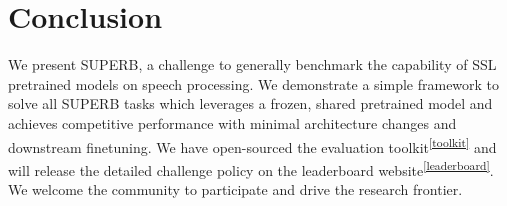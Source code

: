 \documentclass[a4paper]{article}
\begin{document}
\section{Conclusion}

We present SUPERB, a challenge to generally benchmark the capability of SSL pretrained models on speech processing.
We demonstrate a simple framework to solve all SUPERB tasks which leverages a frozen, shared pretrained model and achieves competitive performance with minimal architecture changes and downstream finetuning.
We have open-sourced the evaluation toolkit\textsuperscript{\ref{toolkit}} and will release the detailed challenge policy on the leaderboard website\textsuperscript{\ref{leaderboard}}.
We welcome the community to participate and drive the research frontier.
 




\end{document}
